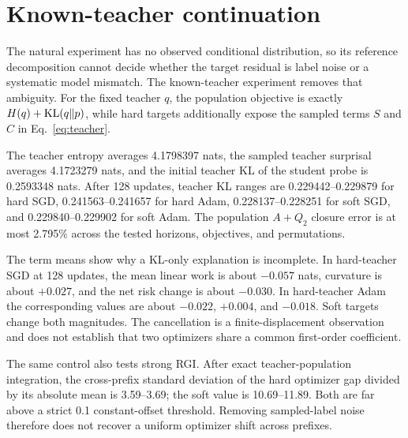 \section{Known-teacher continuation}

The natural experiment has no observed conditional distribution, so its reference decomposition cannot decide whether the target residual is label noise or a systematic model mismatch.  The known-teacher experiment removes that ambiguity.  For the fixed teacher \(q\), the population objective is exactly \(H(q)+\operatorname{KL}(q\Vert p)\), while hard targets additionally expose the sampled terms \(S\) and \(C\) in Eq.~\eqref{eq:teacher}.

The teacher entropy averages 4.1798397 nats, the sampled teacher surprisal averages 4.1723279 nats, and the initial teacher KL of the student probe is 0.2593348 nats.  After 128 updates, teacher KL ranges are 0.229442--0.229879 for hard SGD, 0.241563--0.241657 for hard Adam, 0.228137--0.228251 for soft SGD, and 0.229840--0.229902 for soft Adam.  The population \(A+Q_2\) closure error is at most 2.795\% across the tested horizons, objectives, and permutations.

The term means show why a KL-only explanation is incomplete.  In hard-teacher SGD at 128 updates, the mean linear work is about \(-0.057\) nats, curvature is about \(+0.027\), and the net risk change is about \(-0.030\).  In hard-teacher Adam the corresponding values are about \(-0.022\), \(+0.004\), and \(-0.018\).  Soft targets change both magnitudes.  The cancellation is a finite-displacement observation and does not establish that two optimizers share a common first-order coefficient.

The same control also tests strong RGI.  After exact teacher-population integration, the cross-prefix standard deviation of the hard optimizer gap divided by its absolute mean is 3.59--3.69; the soft value is 10.69--11.89.  Both are far above a strict 0.1 constant-offset threshold.  Removing sampled-label noise therefore does not recover a uniform optimizer shift across prefixes.
